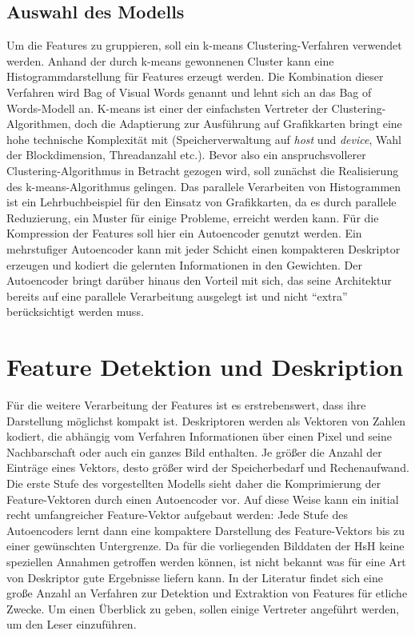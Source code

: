 \subsection{Auswahl des Modells}

Um die Features zu gruppieren, soll ein k-means Clustering-Verfahren verwendet werden. Anhand der durch k-means gewonnenen Cluster kann eine Histogrammdarstellung für Features erzeugt werden. Die Kombination dieser Verfahren wird Bag of Visual Words genannt und lehnt sich an das Bag of Words-Modell an. K-means ist einer der einfachsten Vertreter der Clustering-Algorithmen, doch die Adaptierung zur Ausführung auf Grafikkarten bringt eine hohe technische Komplexität mit (Speicherverwaltung auf \textit{host} und \textit{device}, Wahl der Blockdimension, Threadanzahl etc.). Bevor also ein anspruchsvollerer Clustering-Algorithmus in Betracht gezogen wird, soll zunächst die Realisierung des k-means-Algorithmus gelingen. Das parallele Verarbeiten von Histogrammen ist ein Lehrbuchbeispiel für den Einsatz von Grafikkarten, da es durch parallele Reduzierung, ein Muster für einige Probleme, erreicht werden kann. \newline
Für die Kompression der Features soll hier ein Autoencoder genutzt werden. Ein mehrstufiger Autoencoder kann mit jeder Schicht einen kompakteren Deskriptor erzeugen und kodiert die gelernten Informationen in den Gewichten. Der Autoencoder bringt darüber hinaus den Vorteil mit sich, das seine Architektur bereits auf eine parallele Verarbeitung ausgelegt ist und nicht \enquote{extra} berücksichtigt werden muss.

\section{Feature Detektion und Deskription}
\label{extraction}

Für die weitere Verarbeitung der Features ist es erstrebenswert, dass ihre Darstellung möglichst kompakt ist. Deskriptoren werden als Vektoren von Zahlen kodiert, die abhängig vom Verfahren Informationen über einen Pixel und seine Nachbarschaft oder auch ein ganzes Bild enthalten. Je größer die Anzahl der Einträge eines Vektors, desto größer wird der Speicherbedarf und Rechenaufwand.
Die erste Stufe des vorgestellten Modells sieht daher die Komprimierung der Feature-Vektoren durch einen Autoencoder vor. Auf diese Weise kann ein initial recht umfangreicher Feature-Vektor aufgebaut werden: Jede Stufe des Autoencoders lernt dann eine kompaktere Darstellung des Feature-Vektors bis zu einer gewünschten Untergrenze.\newline
Da für die vorliegenden Bilddaten der HsH keine speziellen Annahmen getroffen werden können, ist nicht bekannt was für eine Art von Deskriptor gute Ergebnisse liefern kann. In der Literatur findet sich eine große Anzahl an Verfahren zur Detektion und Extraktion von Features für etliche Zwecke. Um einen Überblick zu geben, sollen einige Vertreter angeführt werden, um den Leser einzuführen.


